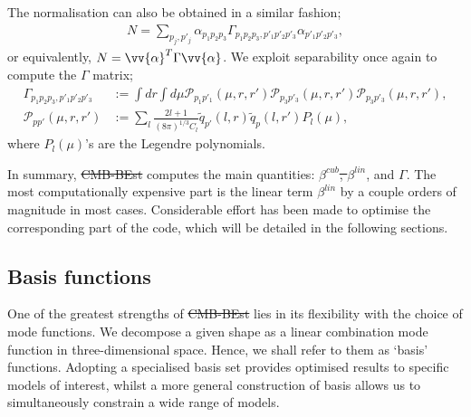 \documentclass[a4paper,12pt,times,custombib,print,index]{Classes/PhDThesisPSnPDF} %
\providecommand{\DIFadd}[1]{{\protect\color{blue}\uwave{#1}}} %
\providecommand{\DIFdel}[1]{{\protect\color{red}\sout{#1}}}                      %
\providecommand{\DIFaddbegin}{} %
\providecommand{\DIFaddend}{} %
\providecommand{\DIFdelbegin}{} %
\providecommand{\DIFdelend}{} %
\newcommand{\DIFscaledelfig}{0.5}
\newlength{\DIFdelgraphicswidth} %
\newlength{\DIFdelgraphicsheight} %
\newcommand{\DIFaddincludegraphics}[2][]{{\color{blue}\fbox{\DIFOincludegraphics[#1]{#2}}}} %
\newcommand{\DIFdelincludegraphics}[2][]{%
\sbox{\DIFdelgraphicsbox}{\DIFOincludegraphics[#1]{#2}}%
\settoboxwidth{\DIFdelgraphicswidth}{\DIFdelgraphicsbox} %
\settoboxtotalheight{\DIFdelgraphicsheight}{\DIFdelgraphicsbox} %
\scalebox{\DIFscaledelfig}{%
\parbox[b]{\DIFdelgraphicswidth}{\usebox{\DIFdelgraphicsbox}\\[-\baselineskip] \rule{\DIFdelgraphicswidth}{0em}}\llap{\resizebox{\DIFdelgraphicswidth}{\DIFdelgraphicsheight}{%
\setlength{\unitlength}{\DIFdelgraphicswidth}%
\begin{picture}(1,1)%
\thicklines\linethickness{2pt} %
{\color[rgb]{1,0,0}\put(0,0){\framebox(1,1){}}}%
{\color[rgb]{1,0,0}\put(0,0){\line( 1,1){1}}}%
{\color[rgb]{1,0,0}\put(0,1){\line(1,-1){1}}}%
\end{picture}%
}\hspace*{3pt}}} %
} %
\DeclareRobustCommand{\DIFaddbegin}{\DIFOaddbegin \let\includegraphics\DIFaddincludegraphics} %
\DeclareRobustCommand{\DIFaddend}{\DIFOaddend \let\includegraphics\DIFOincludegraphics} %
\DeclareRobustCommand{\DIFdelbegin}{\DIFOdelbegin \let\includegraphics\DIFdelincludegraphics} %
\DeclareRobustCommand{\DIFdelend}{\DIFOaddend \let\includegraphics\DIFOincludegraphics} %
\begin{document}
The normalisation can also be obtained in a similar fashion;
\begin{align}
	N = \sum_{p_j, p'_j} \alpha_{p_1 p_2 p_3} \Gamma_{p_1 p_2 p_3, p'_1 p'_2 p'_3} \alpha_{p'_1 p'_2 p'_3}, \label{eqn:normlisation_from_gamma}
\end{align}
or equivalently, $N = \vv{\alpha}^T \Gamma \vv{\alpha}$. We exploit separability once again to compute the $\Gamma$ matrix;
\begin{align}
	\Gamma_{p_1 p_2 p_3, p'_1 p'_2 p'_3} &:= \int dr \int d\mu \mathcal{P}_{p_1 p'_1}(\mu, r, r') \mathcal{P}_{p_3 p'_3}(\mu, r, r') \mathcal{P}_{p_3 p'_3}(\mu, r, r'), 	\label{def:gamma} 	\\
	\mathcal{P}_{p p'}(\mu, r, r') &:= \sum_l \frac{2l+1}{(8\pi)^{1/3} C_l} \tilde{q}_{p'}(l,r) \tilde{q}_p(l,r') P_l(\mu),
\end{align}
where $P_l(\mu)$'s are the Legendre polynomials.

In summary, \DIFdelbegin \DIFdel{CMB-BEst }\DIFdelend \DIFaddbegin \textsc{\DIFadd{CMB-BEst}} \DIFaddend computes the main quantities: \DIFdelbegin \DIFdel{$\beta^{cub}$, $\beta^{lin}$}\DIFdelend \DIFaddbegin \DIFadd{$\beta^\text{cub}$, $\beta^\text{lin}$}\DIFaddend , and $\Gamma$. The most computationally expensive part is the linear term \DIFdelbegin \DIFdel{$\beta^{lin}$ }\DIFdelend \DIFaddbegin \DIFadd{$\beta^\text{lin}$ }\DIFaddend by a couple \DIFaddbegin \DIFadd{of }\DIFaddend orders of magnitude in most cases. Considerable effort has been made to optimise the corresponding part of the code, which will be detailed in the following sections.

\subsection{Basis functions} \label{section:basis_functions}

One of the greatest strengths of \DIFdelbegin \DIFdel{CMB-BEst }\DIFdelend \DIFaddbegin \textsc{\DIFadd{CMB-BEst}} \DIFaddend lies in its flexibility with the choice of mode functions. We decompose a given shape as a linear combination mode function in three-dimensional space. Hence, we shall refer to them as `basis' functions. Adopting a specialised basis set provides optimised results to specific models of interest, whilst a more general construction of basis allows us to simultaneously constrain a wide range of models.
\end{document}
